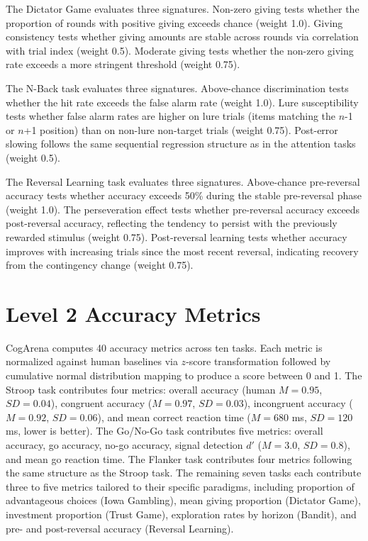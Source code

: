 The Dictator Game evaluates three signatures. Non-zero giving tests whether the proportion of rounds with positive giving exceeds chance (weight 1.0). Giving consistency tests whether giving amounts are stable across rounds via correlation with trial index (weight 0.5). Moderate giving tests whether the non-zero giving rate exceeds a more stringent threshold (weight 0.75).

The N-Back task evaluates three signatures. Above-chance discrimination tests whether the hit rate exceeds the false alarm rate (weight 1.0). Lure susceptibility tests whether false alarm rates are higher on lure trials (items matching the $n$-1 or $n$+1 position) than on non-lure non-target trials (weight 0.75). Post-error slowing follows the same sequential regression structure as in the attention tasks (weight 0.5).

The Reversal Learning task evaluates three signatures. Above-chance pre-reversal accuracy tests whether accuracy exceeds 50\% during the stable pre-reversal phase (weight 1.0). The perseveration effect tests whether pre-reversal accuracy exceeds post-reversal accuracy, reflecting the tendency to persist with the previously rewarded stimulus (weight 0.75). Post-reversal learning tests whether accuracy improves with increasing trials since the most recent reversal, indicating recovery from the contingency change (weight 0.75).

\section{Level 2 Accuracy Metrics}
\label{app:metrics}

CogArena computes 40 accuracy metrics across ten tasks. Each metric is normalized against human baselines via $z$-score transformation followed by cumulative normal distribution mapping to produce a score between 0 and 1. The Stroop task contributes four metrics: overall accuracy (human $M = 0.95$, $\mathit{SD} = 0.04$), congruent accuracy ($M = 0.97$, $\mathit{SD} = 0.03$), incongruent accuracy ($M = 0.92$, $\mathit{SD} = 0.06$), and mean correct reaction time ($M = 680$ ms, $\mathit{SD} = 120$ ms, lower is better). The Go/No-Go task contributes five metrics: overall accuracy, go accuracy, no-go accuracy, signal detection $d'$ ($M = 3.0$, $\mathit{SD} = 0.8$), and mean go reaction time. The Flanker task contributes four metrics following the same structure as the Stroop task. The remaining seven tasks each contribute three to five metrics tailored to their specific paradigms, including proportion of advantageous choices (Iowa Gambling), mean giving proportion (Dictator Game), investment proportion (Trust Game), exploration rates by horizon (Bandit), and pre- and post-reversal accuracy (Reversal Learning).

